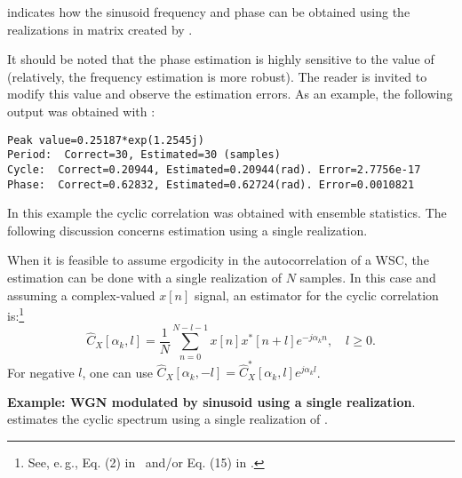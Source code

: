  indicates how the sinusoid frequency
and phase can be obtained using the realizations in matrix  created by . 



It should be noted that the phase estimation is highly
sensitive to the value of  (relatively, the frequency estimation
is more robust). The reader is invited to modify this value
and observe the estimation errors. As an example, the following output was obtained with :
\begin{verbatim}
Peak value=0.25187*exp(1.2545j)
Period:  Correct=30, Estimated=30 (samples)
Cycle:  Correct=0.20944, Estimated=0.20944(rad). Error=2.7756e-17
Phase:  Correct=0.62832, Estimated=0.62724(rad). Error=0.0010821
\end{verbatim}

In this example the cyclic correlation was obtained with ensemble statistics. The following
discussion concerns estimation using a single realization.
\eExample

When it is feasible to assume ergodicity in the autocorrelation of a WSC, the estimation
can be done with a single realization of $N$ samples. In this case and assuming a complex-valued
$x[n]$ signal, an estimator for the cyclic correlation is:\footnote{See, e.\,g., Eq. (2) in~\cite{Genossar94} and/or Eq. (15) in \cite{Gini98}.}
\begin{equation}
\hat C_{X}[\alpha_k,l] = \frac{1}{N}\sum_{n=0}^{N-l-1} x[n] x^*[n+l] e^{-j \alpha_k n}, \textrm{~~~} l \ge 0.
\label{eq:cyclicCorrelationErgodicEstimation}
\end{equation}
For negative $l$, one can use $\hat C_{X}[\alpha_k,-l]=\hat C_{X}^*[\alpha_k,l] e^{j \alpha_k l}$.

\bExample \textbf{Example: WGN modulated by sinusoid using a single realization}.
\label{ex:wgnModulatedSingleRealization}
 estimates the cyclic spectrum using a single realization of .



